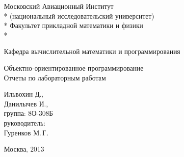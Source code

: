 % 
% 

\begin{titlepage}

\newpage

\begin{center}
Московский Авиационный Институт \\*
(национальный исследовательский университет) \\*
Факультет прикладной математики и физики \\*
\hrulefill
\end{center}

\begin{center}
Кафедра вычислительной математики и программирования
\end{center}

\vspace{6em}

\begin{center}
\Large Объектно-ориентированное программирование \\
	Отчеты по лабораторным работам %
\end{center}

\vspace{2em}
\vspace{6em}

\begin{flushright}
	Ильвохин Д., \\
	Данилычев И., \\
	группа: 8О-308Б \\
\vspace{1em}
руководитель:\\
	Гуренков М.\,Г. \\
\end{flushright}

\vspace{\fill}

\begin{center}
Москва, 2013
\end{center}

\end{titlepage}

% 
